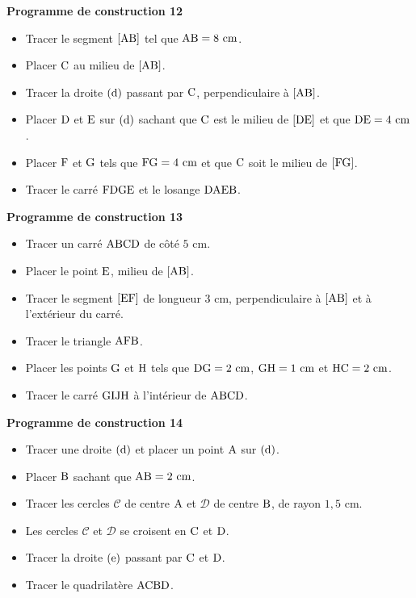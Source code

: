 \documentclass{article}
\begin{document}
\noindent\textbf{Programme de construction 12}\par\smallskip\noindent
\begin{itemize}
    \item Tracer le segment $[\text{AB}]$ tel que
    $\text{AB}=8\text{ cm}$.
    \item Placer $\text{C}$ au milieu de $[\text{AB}]$.
    \item Tracer la droite $(\text{d})$ passant par
    $\text{C}$, perpendiculaire à $[\text{AB}]$.
    \item Placer $\text{D}$ et $\text{E}$ sur
    $(\text{d})$ sachant que $\text{C}$ est le milieu de
    $[\text{DE}]$ et que $\text{DE}=4\text{ cm}$.
    \item Placer $\text{F}$ et $\text{G}$ tels que
    $\text{FG}=4\text{ cm}$ et que $\text{C}$ soit le milieu
    de $[\text{FG}]$.
    \item Tracer le carré $\text{FDGE}$ et le losange
    $\text{DAEB}$.
\end{itemize}
\noindent\textbf{Programme de construction 13}\par\smallskip\noindent
\begin{itemize}
    \item Tracer un carré $\text{ABCD}$ de côté $5\text{ cm}$.
    \item Placer le point $\text{E}$, milieu de $[\text{AB}]$.
    \item Tracer le segment $[\text{EF}]$ de longueur $3\text{ cm}$,
    perpendiculaire à $[\text{AB}]$ et à l'extérieur du carré.
    \item Tracer le triangle $\text{AFB}$.
    \item Placer les points $\text{G}$ et $\text{H}$ tels que
    $\text{DG}=2\text{ cm}$, $\text{GH}=1\text{ cm}$ et
    $\text{HC}=2\text{ cm}$.
    \item Tracer le carré $\text{GIJH}$ à l'intérieur de
    $\text{ABCD}$.
\end{itemize}
\noindent\textbf{Programme de construction 14}\par\smallskip\noindent
\begin{itemize}
    \item Tracer une droite $(\text{d})$ et placer un point
    $\text{A}$ sur $(\text{d})$.
    \item Placer $\text{B}$ sachant que $\text{AB}=2\text{ cm}$.
    \item Tracer les cercles $\mathcal{C}$ de centre $\text{A}$ et
    $\mathcal{D}$ de centre $\text{B}$, de rayon $1{,}5\text{ cm}$.
    \item Les cercles $\mathcal{C}$ et $\mathcal{D}$ se croisent en
    $\text{C}$ et $\text{D}$.
    \item Tracer la droite $(\text{e})$ passant par
    $\text{C}$ et $\text{D}$.
    \item Tracer le quadrilatère $\text{ACBD}$.
\end{itemize}
\end{document}
